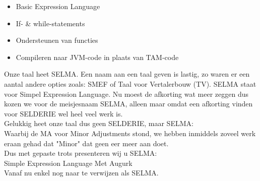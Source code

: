 \documentclass[]{article}
\begin{document}
\begin{itemize}
\item Basic Expression Language
\item If- \& while-statements
\item Ondersteunen van functies
\item Compileren naar JVM-code in plaats van TAM-code
\end{itemize}

Onze taal heet SELMA. Een naam aan een taal geven is lastig, zo waren er een aantal andere opties zoals: SMEF of Taal voor Vertalerbouw (TV).
SELMA staat voor Simpel Expression Language. Nu moest de afkorting wat meer zeggen dus kozen we voor de meisjesnaam SELMA, alleen maar omdat een afkorting vinden voor SELDERIE wel heel veel werk is.\\
Gelukkig heet onze taal dus geen SELDERIE, maar SELMA:\\
Waarbij de MA voor Minor Adjustments stond, we hebben inmiddels zoveel werk eraan gehad dat "Minor" dat geen eer meer aan doet. \\
Dus met gepaste trots presenteren wij u SELMA:\\
Simple Expression Language Met Augurk\\
Vanaf nu enkel nog naar te verwijzen als SELMA.\\

\newpage
\end{document}
